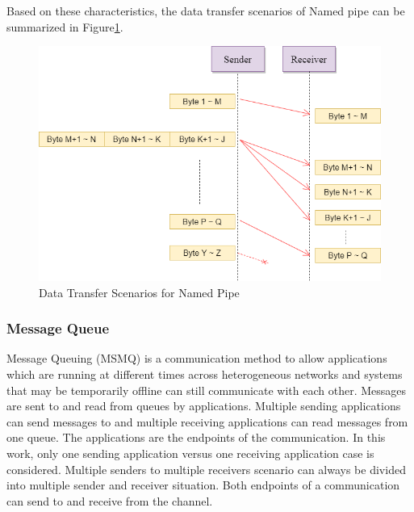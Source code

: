 Based on these characteristics, the data transfer scenarios of Named pipe can be summarized in Figure\ref{namedpipe}. 
\begin{figure}[H]
\centerline{\includegraphics[scale=0.48]{Figures/namedpipe}}
\caption{Data Transfer Scenarios for Named Pipe}
\label{namedpipe}
\end{figure}

\subsubsection{Message Queue}
Message Queuing (MSMQ) is a communication method to allow applications which are running at different times across heterogeneous networks and systems that may be temporarily offline can still communicate with each other. Messages are sent to and read from queues by applications. Multiple sending applications can send messages to and multiple receiving applications can read messages from one queue.\cite{redkar2004pro} The applications are the endpoints of the communication. In this work, only one sending application versus one receiving application case is considered. Multiple senders to multiple receivers scenario can always be divided into multiple sender and receiver situation. Both endpoints of a communication can send to and receive from the channel.

